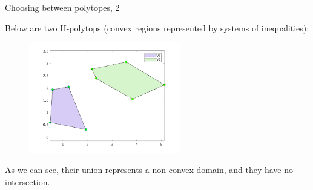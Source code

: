 \documentclass{beamer}
\begin{document}
\begin{frame}{Choosing between polytopes, 2}
\begin{flushleft}

Below are two H-polytops (convex regions represented by systems of inequalities):

\begin{figure} [h!]
\begin{center}
\includegraphics[width=2.6in]{fig1.png}
\end{center} 
\end{figure}

As we can see, their union represents a non-convex domain, and they have no intersection.

\end{flushleft}
\end{frame}
\end{document}
